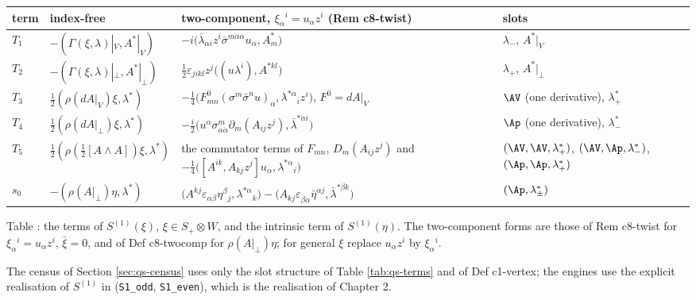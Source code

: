 \begin{longtable}{l|p{3.6cm}|p{7.2cm}|p{3.2cm}}
term & index-free & two-component, $\xi_\alpha{}^i=u_\alpha z^i$ (Rem c8-twist) & slots\\
\hline
$T_1$ & $-(\Gamma(\xi,\lambda)|_V,A^*|_V)$ & $-i\big(\bar\lambda_{\dot\alpha i}z^i\bar\sigma^{m\dot\alpha\alpha}u_\alpha,A^*_m\big)$ & $\lambda_-$, $A^*|_V$\\
$T_2$ & $-(\Gamma(\xi,\lambda)|_\perp,A^*|_\perp)$ & $\tfrac12\varepsilon_{jikl}z^j\big((u\lambda^i),A^{*kl}\big)$ & $\lambda_+$, $A^*|_\perp$\\
$T_3$ & $\tfrac12(\rho(dA|_V)\xi,\lambda^*)$ & $-\tfrac14\big(F^0_{mn}(\sigma^m\bar\sigma^nu)_\alpha,\lambda^{*\alpha}{}_iz^i\big)$, $F^0=dA|_V$ & $\AV$ (one derivative), $\lambda^*_+$\\
$T_4$ & $\tfrac12(\rho(dA|_\perp)\xi,\lambda^*)$ & $-\tfrac i2\big(u^\alpha\sigma^m_{\alpha\dot\alpha}\partial_m(A_{ij}z^j),\bar\lambda^{*\dot\alpha i}\big)$ & $\Ap$ (one derivative), $\lambda^*_-$\\
$T_{5}$ & $\tfrac12(\rho(\tfrac12[A\wedge A])\xi,\lambda^*)$ & the commutator terms of $F_{mn}$, $D_m(A_{ij}z^j)$ and $-\tfrac14\big([A^{ik},A_{kj}z^j]u_\alpha,\lambda^{*\alpha}{}_i\big)$ & $(\AV,\AV,\lambda^*_+)$, $(\AV,\Ap,\lambda^*_-)$, $(\Ap,\Ap,\lambda^*_+)$\\
$s_0$ & $-(\rho(A|_\perp)\eta,\lambda^*)$ & $\big(A^{kj}\varepsilon_{\alpha\beta}\eta^\beta{}_j,\lambda^{*\alpha}{}_k\big)-\big(A_{kj}\varepsilon_{\dot\beta\dot\alpha}\bar\eta^{\dot\alpha j},\bar\lambda^{*\dot\beta k}\big)$ & $(\Ap,\lambda^*_\pm)$\\
\end{longtable}
\begin{center}Table \thetable\label{tab:qs-terms}: the terms of $S^{(1)}(\xi)$, $\xi\in S_+\otimes W$, and the intrinsic term of $S^{(1)}(\eta)$. The two-component forms are those of Rem c8-twist for $\xi_\alpha{}^i=u_\alpha z^i$, $\bar\xi=0$, and of Def c8-twocomp for $\rho(A|_\perp)\eta$; for general $\xi$ replace $u_\alpha z^i$ by $\xi_\alpha{}^i$.\end{center}

The census of Section \ref{sec:qs-census} uses only the slot structure of Table \ref{tab:qs-terms} and of Def c1-vertex; the engines use the explicit realisation of $S^{(1)}$ in  (\texttt{S1\_odd}, \texttt{S1\_even}), which is the realisation of Chapter 2.

